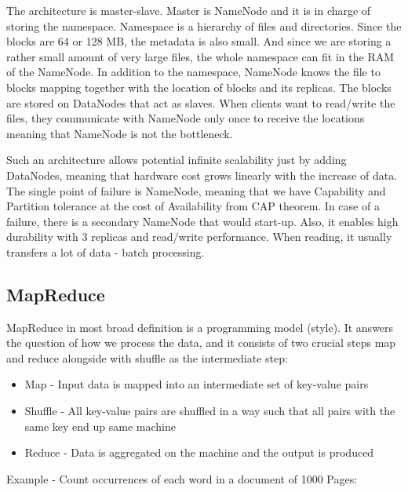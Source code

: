 The architecture is master-slave. Master is NameNode and it is in charge of storing the namespace. Namespace is a hierarchy of files and directories. Since the blocks are 64 or 128 MB, the metadata is also small. And since we are storing a rather small amount of very large files, the whole namespace can fit in the RAM of the NameNode. In addition to the namespace, NameNode knows the file to blocks mapping together with the location of blocks and its replicas. The blocks are stored on DataNodes that act as slaves. When clients want to read/write the files, they communicate with NameNode only once to receive the locations meaning that NameNode is not the bottleneck. 

Such an architecture allows potential infinite scalability just by adding DataNodes, meaning that hardware cost grows linearly with the increase of data. The single point of failure is NameNode, meaning that we have Capability and Partition tolerance at the cost of Availability from CAP theorem. In case of a failure, there is a secondary NameNode that would start-up. Also, it enables high durability with 3 replicas and read/write performance. When reading, it usually transfers a lot of data - batch processing.

\subsection{MapReduce}
MapReduce \cite{MapReduce} in most broad definition is a programming model (style). It answers the question of how we process the data, and it consists of two crucial steps map and reduce alongside with shuffle as the intermediate step: 
\begin{itemize}
	\item Map - Input data is mapped into an intermediate set of key-value pairs
	\item Shuffle - All key-value pairs are shuffled in a way such that all pairs with the same key end up same machine
	\item Reduce - Data is aggregated on the machine and the output is produced
\end{itemize}
Example - Count occurrences of each word in a document of 1000 Pages:


